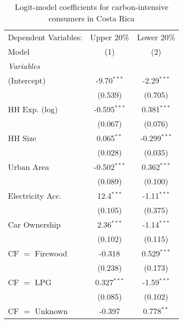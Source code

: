 
\begin{table}[htbp!]
   \centering
   \small
   \begin{adjustbox}{width = 1\textwidth, max height = 0.95\textheight, center}
      \begin{threeparttable}[b]
         \caption{\label{tab:Logit_1_CRI} Logit-model coefficients for carbon-intensive consumers in Costa Rica}
         \begin{tabular}{lcc}
            \tabularnewline \midrule \midrule
            Dependent Variables: & Upper 20\%     & Lower 20\%\\   
            Model                & (1)            & (2)\\  
            \midrule
            \emph{Variables}\\
            (Intercept)          & -9.70$^{***}$  & -2.29$^{***}$\\   
                                 & (0.539)        & (0.705)\\   
            HH Exp. (log)        & -0.595$^{***}$ & 0.381$^{***}$\\   
                                 & (0.067)        & (0.076)\\   
            HH Size              & 0.065$^{**}$   & -0.299$^{***}$\\   
                                 & (0.028)        & (0.035)\\   
            Urban Area           & -0.502$^{***}$ & 0.362$^{***}$\\   
                                 & (0.089)        & (0.100)\\   
            Electricity Acc.     & 12.4$^{***}$   & -1.11$^{***}$\\   
                                 & (0.105)        & (0.375)\\   
            Car Ownership        & 2.36$^{***}$   & -1.14$^{***}$\\   
                                 & (0.102)        & (0.115)\\   
            CF $=$ Firewood      & -0.318         & 0.529$^{***}$\\   
                                 & (0.238)        & (0.173)\\   
            CF $=$ LPG           & 0.327$^{***}$  & -1.59$^{***}$\\   
                                 & (0.085)        & (0.102)\\   
            CF $=$ Unknown       & -0.397         & 0.778$^{**}$\\   

\end{tabular}
\end{threeparttable}
\end{adjustbox}
\end{table}
